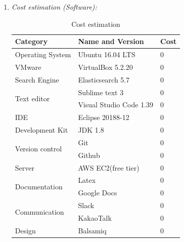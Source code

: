 \documentclass[conference]{IEEEtran}
\begin{document}
\begin{enumerate}
  \item \textit{Cost estimation (Software): } 
  \begin{table}[htbp]
  \renewcommand{\arraystretch}{1.5}
\caption{Cost estimation}
\begin{center}
\begin{tabular}{|p{3cm}|p{3.7cm}|p{0.5cm}|}
\hline
\textbf{Category       } & \textbf{Name and Version   } &\textbf{Cost} \\
\hline
Operating System &Ubuntu  16.04 LTS&0 \\
\hline
VMware & VirtualBox 5.2.20&0 \\
\hline
Search Engine & Elasticsearch 5.7 &0 \\
\hline
\multirow{2}{*}{Text editor} & Sublime text 3 &0 \\
& Visual Studio Code 1.39 &0  \\
\hline
IDE & Eclipse 20188-12 &0 \\
\hline
Development Kit & JDK 1.8 &0 \\
\hline
\multirow{2}{*}{Version control} & Git &0 \\
& Github &0 \\
\hline
Server & AWS EC2(free tier) &0\\
\hline
\multirow{2}{*}{Documentation}&  Latex &0\\
& Google Docs &0\\
\hline
\multirow{2}{*}{Communication} & Slack &0\\
& KakaoTalk &0\\
\hline
Design & Balsamiq&0\\
\hline
\end{tabular}
\label{tab1}
\end{center}
\end{table}
\end{enumerate}
 
\end{document}
